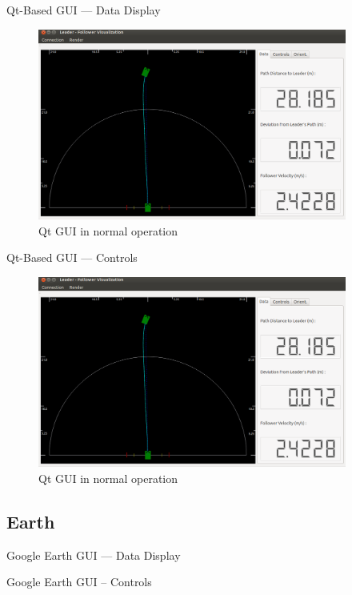 \documentclass{beamer}
\begin{document}
    \begin{frame}{Qt-Based GUI --- Data Display}
      \begin{figure}[ht] \centering
        \includegraphics[width=4in] {../graphics/final_design_data.png}
        \caption{Qt GUI in normal operation} \label{fig:qt_data_display}
      \end{figure}
    \end{frame}

    \begin{frame}{Qt-Based GUI --- Controls}
      \begin{figure}[ht] \centering
        \includegraphics[width=4in] {../graphics/final_design_data.png}
        \caption{Qt GUI in normal operation} \label{fig:qt_controls}
      \end{figure}
    \end{frame}

  \subsection{Earth}

    \begin{frame}{Google Earth GUI --- Data Display}
    \end{frame}

    \begin{frame}{Google Earth GUI -- Controls}
    \end{frame}
\end{document}
